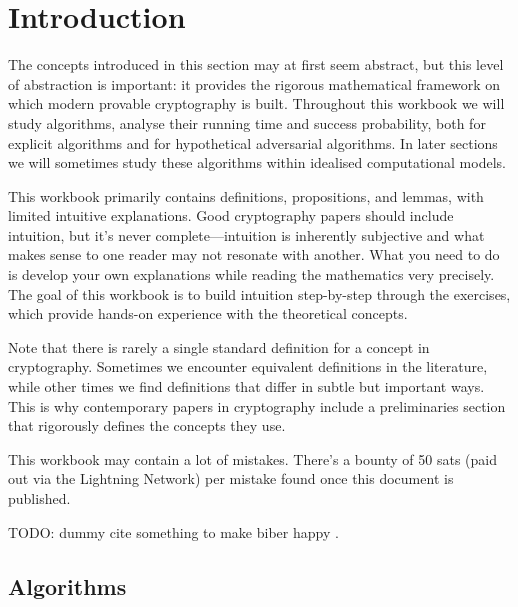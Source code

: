 \section{Introduction}\label{sec:intro}

The concepts introduced in this section may at first seem abstract, but this level of abstraction is important: it provides the rigorous mathematical framework on which modern provable cryptography is built.
Throughout this workbook we will study algorithms, analyse their running time and success probability, both for explicit algorithms and for hypothetical adversarial algorithms.
In later sections we will sometimes study these algorithms within idealised computational models.

This workbook primarily contains definitions, propositions, and lemmas, with limited intuitive explanations.
Good cryptography papers should include intuition, but it's never complete---intuition is inherently subjective and what makes sense to one reader may not resonate with another.
What you need to do is develop your own explanations while reading the mathematics very precisely.
The goal of this workbook is to build intuition step-by-step through the exercises, which provide hands-on experience with the theoretical concepts.

Note that there is rarely a single standard definition for a concept in cryptography.
Sometimes we encounter equivalent definitions in the literature, while other times we find definitions that differ in subtle but important ways.
This is why contemporary papers in cryptography include a preliminaries section that rigorously defines the concepts they use.

This workbook may contain a lot of mistakes.
There's a bounty of 50 sats (paid out via the Lightning Network) per mistake found once this document is published.



TODO: dummy cite something to make biber happy \textcite{EPRINT:NicRufSeu20}.

\subsection{Algorithms}

